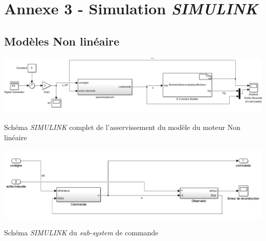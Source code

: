 \chapter*{Annexe 3 - Simulation \emph{SIMULINK}}

\section*{Modèles Non linéaire}\label{annex:modl_NL_SIMULINK}
\includegraphics[width = \textwidth]{./annexes/annexe3/NL_RE_BlocEntier.png}
\caption{Schéma \emph{SIMULINK} complet de l'asservissement du modèle du moteur Non linéaire}\label{fig:SIMULINK_NL_schema}

\includegraphics[width = \textwidth]{./annexes/annexe3/NL_RE_blocAsservissement.PNG}
\caption{Schéma \emph{SIMULINK} du \emph{sub-system} de commande}\label{fig:SIMULINK_NL_subsystem_schema}